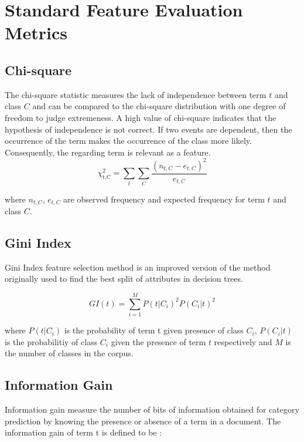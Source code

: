\documentclass[a4paper, 14pt]{article}
\begin{document}
\section{Standard Feature Evaluation Metrics}
\begin{justify}


\subsection{Chi-square}
\begin{justify}
The chi-square statistic measures the lack of independence between term $t$ and class $C$ and can be compared to the chi-square distribution with one degree of freedom to judge extremeness. A high value of chi-square indicates that the hypothesis of independence is not correct. If two events are dependent, then the occurrence of the term makes the occurrence of the class more likely. Consequently, the regarding term is relevant as a feature.
\[
{\chi}^2_{\text{t,C}} =  \sum_{t}{\sum_{C} 
\frac{(n_{t,C} - e_{t,C})^2}{e_{t, C}}}
\]


\justify where $n_{t,C}$, $e_{t,C}$ are observed frequency and expected frequency for term $t$ and class $C$.

\end{justify}

\subsection{Gini Index}
\begin{justify}
Gini Index feature selection method is an improved version of the method originally used to find the best split of attributes in decision trees.


\[
GI \left(t\right) = 
\sum_{i=1}^{M}{P\left( t|C_{i} \right)^2 P\left( C_{i}|t \right)^2}
\]

\justify
where $P(t|C_{i})$ is the probability of term t given presence of class $C_{i}$, $P(C_{i} | t)$ is the probabilitiy of class $C_{i}$ given the presence of term $t$ respectively and $M$ is the number of classes in the corpus.
\end{justify}

\subsection{Information Gain}
\begin{justify}
Information gain\cite{cmu}  measure the number of bits of information obtained for category prediction by knowing the presence or absence of a term in a document. The information gain of term t is defined to be :
    

\end{justify}
\end{justify}
\end{document}
